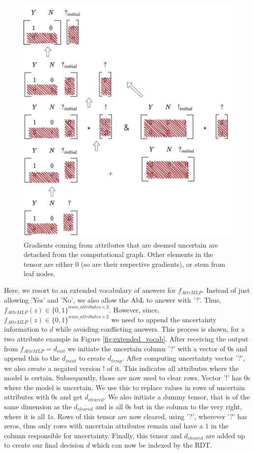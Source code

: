 \documentclass[a4paper,cleardoubleempty,BCOR1cm, 11pt]{report}
\begin{document}
\begin{figure}[t!]
\begin{minipage}{0.45\textwidth}
		\includegraphics[width=1\textwidth]{images/extended_vocab_backward.pdf}
		\caption{Gradients coming from attributes that are deemed uncertain are detached from the computational graph. Other elements in the tensor are either $0$ (so are their respective gradients), or stem from leaf nodes.}
		\label{fig:extended_vocab_backward}
	\end{minipage}
\end{figure}
Here, we resort to an extended vocabulary of answers for $f_{AttrMLP}$. Instead of just allowing 'Yes' and 'No', we also allow the AbL to answer with '?'. Thus, $f_{AttrMLP}(z) \in \lbrace 0,1 \rbrace^{num\_attributes \times 3}$. However, since, $f_{AttrMLP}(z) \in \lbrace 0,1 \rbrace^{num\_attributes \times 2}$ we need to append the uncertainty information to $d$ while avoiding conflicting answers. This process is shown, for a two attribute example in Figure \ref{fig:extended_vocab}. After receiving the output from $f_{AttrMLP} = d_{init}$ we initiate the uncertain column '?' with a vector of $0$s and append this to the $d_{inint}$ to create $d_{temp}$. After computing uncertainty vector '?', we also create a negated version $!$ of it. This indicates all attributes where the model is certain. Subsequently, those are now used to clear rows. Vector '!' has $0$s where the model is uncertain. We use this to replace values in rows of uncertain attributes with $0$s and get $d_{cleared}$. We also initiate a dummy tensor, that is of the same dimension as the $d_{cleared}$ and is all $0$s but in the column to the very right, where it is all $1$s. Rows of this tensor are now cleared, using '?', wherever '?' has zeros, thus only rows with uncertain attributes remain and have a $1$ in the column responsible for uncertainty. Finally, this tensor and $d_{cleared}$ are added up to create our final decision $d$ which can now be indexed by the RDT.\\
\end{document}

